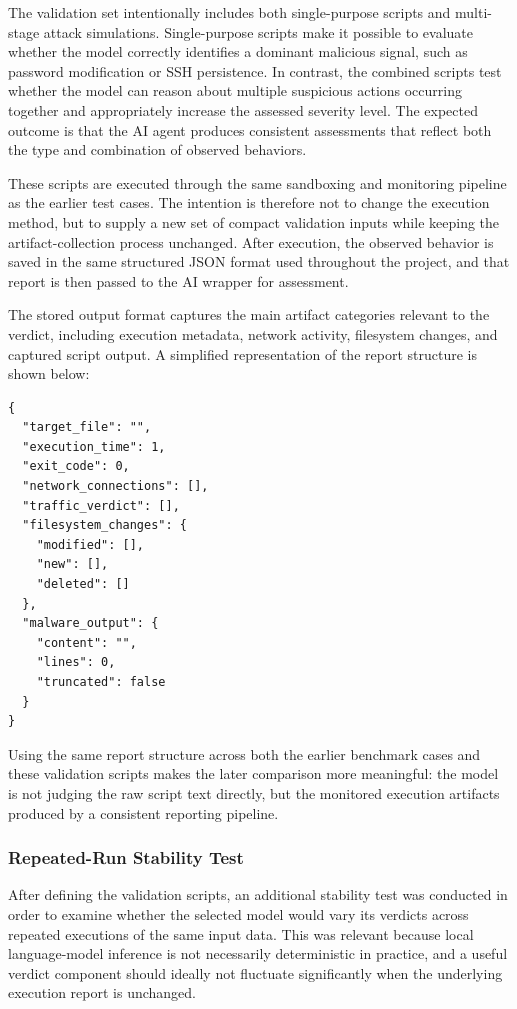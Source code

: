 \vspace{1em}

The validation set intentionally includes both single-purpose scripts and multi-stage attack simulations. Single-purpose scripts make it possible to evaluate whether the model correctly identifies a dominant malicious signal, such as password modification or SSH persistence. In contrast, the combined scripts test whether the model can reason about multiple suspicious actions occurring together and appropriately increase the assessed severity level. The expected outcome is that the AI agent produces consistent assessments that reflect both the type and combination of observed behaviors.

\vspace{1em}

These scripts are executed through the same sandboxing and monitoring pipeline as
the earlier test cases. The intention is therefore not to change the execution
method, but to supply a new set of compact validation inputs while keeping the
artifact-collection process unchanged. After execution, the observed behavior is
saved in the same structured JSON format used throughout the project, and that
report is then passed to the AI wrapper for assessment.



\newpage

The stored output format captures the main artifact categories relevant to the
verdict, including execution metadata, network activity, filesystem changes, and
captured script output. A simplified representation of the report structure is
shown below:

\begin{verbatim}
{
  "target_file": "",
  "execution_time": 1,
  "exit_code": 0,
  "network_connections": [],
  "traffic_verdict": [],
  "filesystem_changes": {
    "modified": [],
    "new": [],
    "deleted": []
  },
  "malware_output": {
    "content": "",
    "lines": 0,
    "truncated": false
  }
}
\end{verbatim}

\noindent
Using the same report structure across both the earlier benchmark cases and these
validation scripts makes the later comparison more meaningful: the model is not
judging the raw script text directly, but the monitored execution artifacts
produced by a consistent reporting pipeline.


\subsubsection{Repeated-Run Stability Test}
\noindent
After defining the validation scripts, an additional stability test was conducted
in order to examine whether the selected model would vary its verdicts across
repeated executions of the same input data. This was relevant because local
language-model inference is not necessarily deterministic in practice, and a
useful verdict component should ideally not fluctuate significantly when the
underlying execution report is unchanged.

